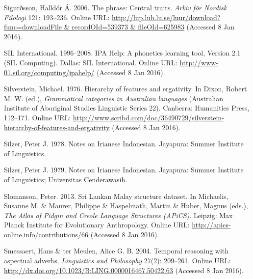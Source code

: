 \begin{styleCitaviBibliographyEntry}
Sigurðsson, Halldór Á. 2006. The   phrase: Central traits. \textit{Arkiv för Nordisk Filologi} 121: 193–236. Online URL: \url{http://lup.lub.lu.se/luur/download?func=downloadFile & recordOId=539373 & fileOId=625983} (Accessed 8 Jan 2016).
\end{styleCitaviBibliographyEntry}

\begin{styleCitaviBibliographyEntry}
SIL International. 1996–2008. IPA Help: A phonetics learning tool, Version 2.1 (SIL Computing). Dallas: SIL International. Online URL: \url{http://www-01.sil.org/computing/ipahelp/} (Accessed 8 Jan 2016).
\end{styleCitaviBibliographyEntry}

\begin{styleCitaviBibliographyEntry}
Silverstein, Michael. 1976. Hierarchy of features and ergativity. In Dixon, Robert M. W. (ed.), \textit{Grammatical categories in Australian languages} (Australian Institute of Aboriginal Studies Linguistic Series 22). Canberra: Humanities Press, 112–171. Online URL: \url{http://www.scribd.com/doc/36490729/silverstein-hierarchy-of-features-and-ergativity} (Accessed 8 Jan 2016).
\end{styleCitaviBibliographyEntry}

\begin{styleCitaviBibliographyEntry}
Silzer, Peter J. 1978. Notes on Irianese Indonesian. Jayapura: Summer Institute of Linguistics.
\end{styleCitaviBibliographyEntry}

\begin{styleCitaviBibliographyEntry}
Silzer, Peter J. 1979. Notes on Irianese Indonesian. Jayapura: Summer Institute of Linguistics; Universitas Cenderawasih.
\end{styleCitaviBibliographyEntry}

\begin{styleCitaviBibliographyEntry}
Slomanson, Peter. 2013. Sri Lankan Malay structure dataset. In Michaelis, Susanne M. \& Maurer, Philippe \& Haspelmath, Martin \& Huber, Magnus (eds.), \textit{The Atlas of Pidgin and Creole Language Structures (APiCS)}. Leipzig: Max Planck Institute for Evolutionary Anthropology. Online URL: \url{http://apics-online.info/contributions/66} (Accessed 8 Jan 2016).
\end{styleCitaviBibliographyEntry}

\begin{styleCitaviBibliographyEntry}
Smessaert, Hans \& ter Meulen, Alice G. B. 2004. Temporal reasoning with aspectual adverbs. \textit{Linguistics and Philosophy} 27(2): 209–261. Online URL: \url{http://dx.doi.org/10.1023/B:LING.0000016467.50422.63} (Accessed 8 Jan 2016).
\end{styleCitaviBibliographyEntry}

